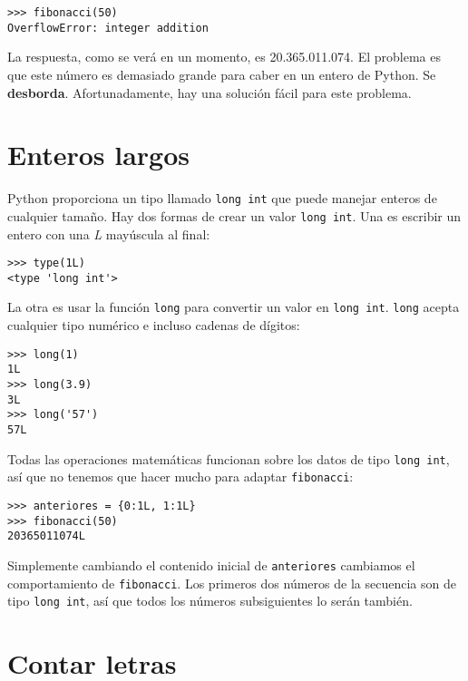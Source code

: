 \begin{lstlisting}
>>> fibonacci(50)
OverflowError: integer addition
\end{lstlisting}

La respuesta, como se verá en un momento, es 20.365.011.074. El problema
es que este número es demasiado grande para caber en un entero de
Python. Se \textbf{desborda}. Afortunadamente, hay una solución fácil
para este problema.

\section{Enteros largos}

  

Python proporciona un tipo llamado \texttt{long int} que puede manejar
enteros de cualquier tamaño. Hay dos formas de crear un valor \texttt{long
int}. Una es escribir un entero con una {\em L} mayúscula al final:

\begin{lstlisting}
>>> type(1L)
<type 'long int'>
\end{lstlisting}
 La otra es usar la función \texttt{long} para convertir un valor
en \texttt{long int}. \texttt{long} acepta cualquier tipo numérico
e incluso cadenas de dígitos:
\begin{lstlisting}
>>> long(1)
1L
>>> long(3.9)
3L
>>> long('57')
57L
\end{lstlisting}

Todas las operaciones matemáticas funcionan sobre los datos de tipo
\texttt{long int}, así que no tenemos que hacer mucho para adaptar
\texttt{fibonacci}:
\begin{lstlisting}
>>> anteriores = {0:1L, 1:1L}
>>> fibonacci(50)
20365011074L
\end{lstlisting}

Simplemente cambiando el contenido inicial de \texttt{anteriores}
cambiamos el comportamiento de \texttt{fibonacci}. Los primeros dos
números de la secuencia son de tipo \texttt{long int}, así que todos
los números subsiguientes lo serán también.

 

\section{Contar letras}

  

